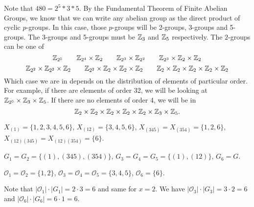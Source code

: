 \protect \documentclass [11pt]{exam}
\renewenvironment{Ans}[1]{\setcounter{question}{#1}\addtocounter{question}{-1}\question }{}
\begin{document}
\begin{questions}
\begin{Ans}{7}
\end{Ans}
\begin{Ans}{8}
Note that $480 = 2^5 * 3 * 5$.  By the Fundamental Theorem of Finite Abelian Groups, we know that we can write any abelian group as the direct product of cyclic $p$-groups.  In this case, those $p$-groups will be 2-groups, 3-groups and 5-groups.  The 3-groups and 5-groups must be $\mathbb Z_3$ and $\mathbb Z_5$ respectively.  The $2$-groups can be one of
\[\mathbb Z_{2^5} \qquad \mathbb Z_{2^4}\times \mathbb Z_2 \qquad \mathbb Z_{2^3}\times \mathbb Z_{2^2} \qquad \mathbb Z_{2^3} \times \mathbb Z_{2}\times\mathbb Z_2\]
\[\mathbb Z_{2^2}\times \mathbb Z_{2^2}\times \mathbb Z_2 \qquad \mathbb Z_{2^2} \times\mathbb Z_2\times \mathbb Z_2\times\mathbb Z_2 \qquad \mathbb Z_2\times\mathbb Z_2\times\mathbb Z_2\times\mathbb Z_2\times\mathbb Z_2\]
Which case we are in depends on the distribution of elements of particular order.  For example, if there are elements of order 32, we will be looking at $\mathbb Z_{2^5}\times\mathbb Z_3\times\mathbb Z_5$.  If there are no elements of order 4, we will be in
\[\mathbb Z_2\times\mathbb Z_2\times\mathbb Z_2\times \mathbb Z_2\times\mathbb Z_2\times \mathbb Z_3\times\mathbb Z_5.\]
\end{Ans}
\begin{Ans}{9}
  $X_{(1)} = \{1,2,3,4,5,6\}$, $X_{(12)} = \{3,4,5,6\}$, $X_{(345)} = X_{(354)} = \{1,2,6\}$, $X_{(12)(345)} = X_{(12)(354)} = \{6\}$.

  $G_1 = G_2 = \{(1),(345),(354)\}$, $G_3 = G_4 = G_5 = \{(1),(12)\}$, $G_6 = G$.

  $\mathcal O_1 = \mathcal O_2 = \{1,2\}$, $\mathcal O_3 = \mathcal O_4 = \mathcal O_5 = \{3,4,5\}$, $\mathcal O_6 = \{6\}$.

  Note that $|\mathcal O_1| \cdot |G_1| = 2 \cdot 3 = 6$ and same for $x = 2$.  We have $|\mathcal O_3|\cdot |G_3| = 3 \cdot 2 = 6$ and $|\mathcal O_6|\cdot |G_6| = 6 \cdot 1 = 6$.


\end{Ans}
\end{questions}
\end{document}
